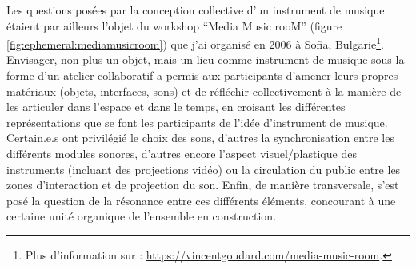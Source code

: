 \indent Les questions posées par la conception collective d'un instrument de musique étaient par ailleurs l'objet du workshop ``Media Music rooM'' (figure \ref{fig:ephemeral:mediamusicroom}) que j'ai organisé en 2006 à Sofia, Bulgarie\footnote{Plus d'information sur : \url{https://vincentgoudard.com/media-music-room}.}. Envisager, non plus un objet, mais un lieu comme instrument de musique sous la forme d'un atelier collaboratif a permis aux participants d'amener leurs propres matériaux (objets, interfaces, sons) et de réfléchir collectivement à la manière de les articuler dans l'espace et dans le temps, en croisant les différentes représentations que se font les participants de l'idée d'instrument de musique. Certain.e.s ont privilégié le choix des sons, d'autres la synchronisation entre les différents modules sonores, d'autres encore l'aspect visuel/plastique des instruments (incluant des projections vidéo) ou la circulation du public entre les zones d'interaction et de projection du son. Enfin, de manière transversale, s'est posé la question de la résonance entre ces différents éléments, concourant à une certaine unité organique de l'ensemble en construction.\\


